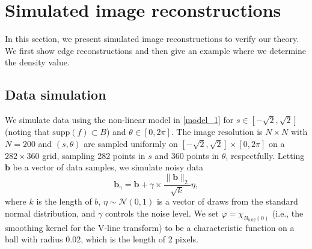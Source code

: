 \documentclass[a4paper,12pt]{amsart}
\numberwithin{equation}{section}
\theoremstyle{plain}
\numberwithin{theorem}{section}
\theoremstyle{definition}
\theoremstyle{remark}
\theoremstyle{remark}
\theoremstyle{remark}
\newcommand{\vb}{\mathbf{b}}
\newcommand{\seanc}[1]{\begin{quotation}\textbf{Sean's comment:\
}{\textit{#1}}\end{quotation}}
\begin{document}



































\section{Simulated image reconstructions}
\label{simulations}
In this section, we present simulated image reconstructions to verify our theory. We first show edge reconstructions and then give an example where we determine the density value.
\subsection{Data simulation}
We simulate data using the non-linear model in \eqref{model_1} for $s\in [-\sqrt{2}, \sqrt{2}]$ (noting that $\text{supp}(f)\subset B$) and $\theta \in [0,2\pi]$. The image resolution is $N \times N$ with $N = 200$ and $(s,\theta)$ are sampled uniformly on $[-\sqrt{2}, \sqrt{2}] \times [0,2\pi]$ on a $282 \times 360$ grid, sampling 282 points in $s$ and 360 points in $\theta$, respectfully. Letting $\vb$ be a vector of data samples, we simulate noisy data \begin{equation}
\vb_\gamma = \vb + \gamma \times \frac{\|\vb\|_2}{\sqrt{k}}\eta,
\end{equation}
where $k$ is the length of $b$, $\eta \sim \mathcal{N}(0,1)$ is a vector of draws from the standard normal distribution, and $\gamma$ controls the noise level. We set $\varphi = \chi_{B_{0.02}(0)}$ (i.e., the smoothing kernel for the V-line transform) to be a characteristic function on a ball with radius 0.02, which is the length of 2 pixels.
\end{document}
